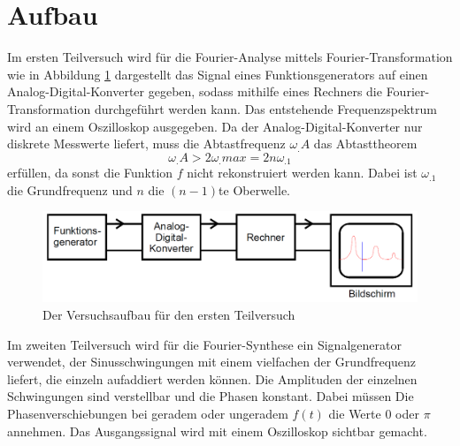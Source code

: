 
\section{Aufbau}
\label{sec:Aufbau}

Im ersten Teilversuch wird für die Fourier-Analyse mittels Fourier-Transformation wie in Abbildung \ref{fig:Aufbau1} dargestellt das Signal eines Funktionsgenerators auf einen Analog-Digital-Konverter gegeben, sodass mithilfe eines Rechners die Fourier-Transformation durchgeführt werden kann. Das entstehende Frequenzspektrum wird an einem Oszilloskop ausgegeben. Da der Analog-Digital-Konverter nur diskrete Messwerte liefert, muss die Abtastfrequenz $\omega_.A$ das Abtasttheorem
\begin{equation}
\omega_.A > 2\omega_.{max} = 2n\omega_.1
\end{equation}
erfüllen, da sonst die Funktion $f$ nicht rekonstruiert werden kann. Dabei ist $\omega_.1$ die Grundfrequenz und $n$ die $(n-1)$te Oberwelle.

\begin{figure}
	\centering
	\includegraphics[width=\linewidth-40pt,height=\textheight-40pt,keepaspectratio]{content/images/Aufbau1.png}
	\caption{Der Versuchsaufbau für den ersten Teilversuch\cite{V351}}
	\label{fig:Aufbau1}
\end{figure}

\newpage
\noindent Im zweiten Teilversuch wird für die Fourier-Synthese ein Signalgenerator verwendet, der Sinusschwingungen mit einem vielfachen der Grundfrequenz liefert, die einzeln aufaddiert werden können. Die Amplituden der einzelnen Schwingungen sind verstellbar und die Phasen konstant. Dabei müssen Die Phasenverschiebungen bei geradem oder ungeradem $f(t)$ die Werte $0$ oder $\pi$ annehmen.  
Das Ausgangssignal wird mit einem Oszilloskop sichtbar gemacht.